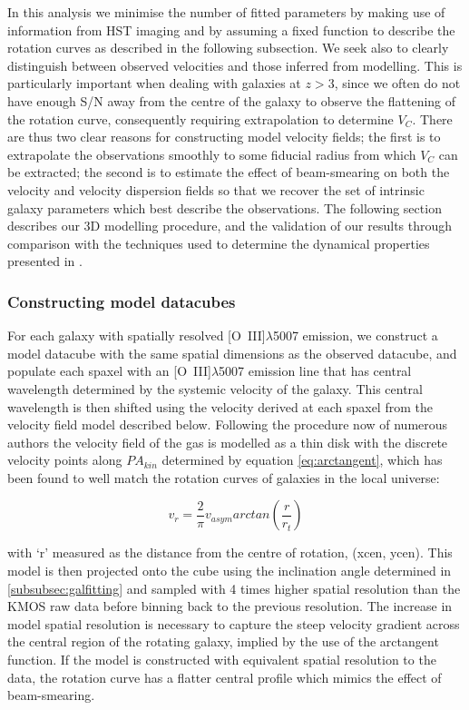 \documentclass[fleqn,usenatbib]{mn2e}
\begin{document}
In this analysis we minimise the number of fitted parameters by making use of information from HST imaging and by assuming a fixed function to describe the rotation curves as described in the following subsection.    
We seek also to clearly distinguish between observed velocities and those inferred from modelling.
This is particularly important when dealing with galaxies at $z > 3$, since we often do not have enough S/N away from the centre of the galaxy to observe the flattening of the rotation curve, consequently requiring extrapolation to determine $V_{C}$.  
There are thus two clear reasons for constructing model velocity fields; the first is to extrapolate the observations smoothly to some fiducial radius from which $V_{C}$ can be extracted; the second is to estimate the effect of beam-smearing on both the velocity and velocity dispersion fields so that we recover the set of intrinsic galaxy parameters which best describe the observations.
The following section describes our 3D modelling procedure, and the validation of our results through comparison with the techniques used to determine the dynamical properties presented in \cite{Harrison2017}.

\subsubsection{Constructing model datacubes}\label{subsubec:model_cube}
For each galaxy with spatially resolved [O~{\sc III}]$\lambda$5007 emission, we construct a model datacube with the same spatial dimensions as the observed datacube, and populate each spaxel with an [O~{\sc III}]$\lambda$5007 emission line that has central wavelength determined by the systemic velocity of the galaxy.
This central wavelength is then shifted using the velocity derived at each spaxel from the velocity field model described below.  
Following the procedure now of numerous authors \citep[e.g.][]{Epinat2010,Epinat2012,Swinbank2012,Stott2016,Mason2016} the velocity field of the gas is modelled as a thin disk with the discrete velocity points along $PA_{kin}$ determined by equation \ref{eq:arctangent}, which has been found to well match the rotation curves of galaxies in the local universe:

\begin{equation}\label{eq:arctangent}
   v_{r} = \frac{2}{\pi}v_{asym}arctan\left(\frac{r}{r_{t}}\right)
\end{equation}

\noindent
with `r' measured as the distance from the centre of rotation, (xcen, ycen).
This model is then projected onto the cube using the inclination angle determined in \cref{subsubsec:galfitting} and sampled with 4 times higher spatial resolution than the KMOS raw data before binning back to the previous resolution.
The increase in model spatial resolution is necessary to capture the steep velocity gradient across the central region of the rotating galaxy, implied by the use of the arctangent function.
If the model is constructed with equivalent spatial resolution to the data, the rotation curve has a flatter central profile which mimics the effect of beam-smearing.
\end{document}
